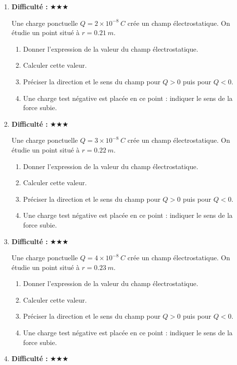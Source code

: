 \documentclass[11pt,a4paper]{article}
\newcommand{\etoiles}[1]{\textbf{Difficulté : }#1}
\begin{document}
\begin{enumerate}[label=\textbf{Exercice \arabic*.},leftmargin=*]
Une charge ponctuelle $Q=1\times10^{-8}\ \si{C}$ crée un champ électrostatique. On étudie un point situé à $r=0.20\ \si{m}$.
\begin{enumerate}[label=\alph*)]
\item Donner l'expression de la valeur du champ électrostatique.
\item Calculer cette valeur.
\item Préciser la direction et le sens du champ pour $Q>0$ puis pour $Q<0$.
\item Une charge test négative est placée en ce point : indiquer le sens de la force subie.
\end{enumerate}
\item \etoiles{★★★}

Une charge ponctuelle $Q=2\times10^{-8}\ \si{C}$ crée un champ électrostatique. On étudie un point situé à $r=0.21\ \si{m}$.
\begin{enumerate}[label=\alph*)]
\item Donner l'expression de la valeur du champ électrostatique.
\item Calculer cette valeur.
\item Préciser la direction et le sens du champ pour $Q>0$ puis pour $Q<0$.
\item Une charge test négative est placée en ce point : indiquer le sens de la force subie.
\end{enumerate}
\item \etoiles{★★★}

Une charge ponctuelle $Q=3\times10^{-8}\ \si{C}$ crée un champ électrostatique. On étudie un point situé à $r=0.22\ \si{m}$.
\begin{enumerate}[label=\alph*)]
\item Donner l'expression de la valeur du champ électrostatique.
\item Calculer cette valeur.
\item Préciser la direction et le sens du champ pour $Q>0$ puis pour $Q<0$.
\item Une charge test négative est placée en ce point : indiquer le sens de la force subie.
\end{enumerate}
\item \etoiles{★★★}

Une charge ponctuelle $Q=4\times10^{-8}\ \si{C}$ crée un champ électrostatique. On étudie un point situé à $r=0.23\ \si{m}$.
\begin{enumerate}[label=\alph*)]
\item Donner l'expression de la valeur du champ électrostatique.
\item Calculer cette valeur.
\item Préciser la direction et le sens du champ pour $Q>0$ puis pour $Q<0$.
\item Une charge test négative est placée en ce point : indiquer le sens de la force subie.
\end{enumerate}
\item \etoiles{★★★}


\end{enumerate}
\end{document}
